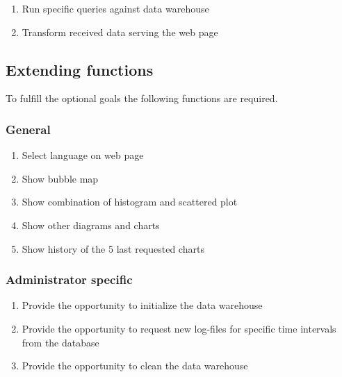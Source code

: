 \begin{enumerate}[resume]
  
  \item Run specific queries against data warehouse \label{f20}
  
  \item Transform received data serving the web page \label{f21}

\end{enumerate}


\subsection{Extending functions}

To fulfill the optional goals the following functions are required.

\subsubsection*{General}
\begin{enumerate}[resume]
  
  \item Select language on web page \label{f22}
  
  \item Show bubble map \label{f23} %
  
  \item Show combination of histogram and scattered plot \label{f24}
  
  \item Show other diagrams and charts \label{f25}
  
  \item Show history of the 5 last requested charts \label{f26}

 
\end{enumerate}


\subsubsection*{Administrator specific}

\begin{enumerate}[resume]
   
  \item Provide the opportunity to initialize the data warehouse\label{f27}
   
  \item Provide the opportunity to request new log-files for specific time intervals
  	from the database \label{f28}
  
  \item Provide the opportunity to clean the data warehouse \label{f29}
   
\end{enumerate}


